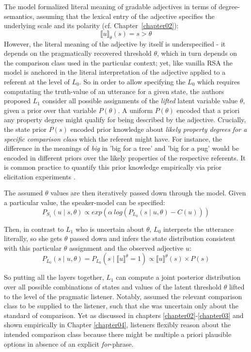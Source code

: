 The model formalized literal meaning of gradable adjectives in terms of degree-semantics, assuming that the lexical entry of the adjective specifies the underlying scale and its polarity (cf. Chapter~\ref{chapter02}):
\begin{equation}
\llbracket u \rrbracket_{\theta} (s) = s > \theta
\end{equation}
However, the literal meaning of the adjective by itself is underspecified - it depends on the pragmatically recovered threshold $\theta$, which in turn depends on the comparison class used in the particular context; yet, like vanilla RSA the model is anchored in the literal interpretation of the adjective applied to a referent at the level of $L_0$.  
So in order to allow specifying the $L_0$ which requires computating the truth-value of an utterance for a given state, the authors proposed $L_1$ consider all possible assignments of the \emph{lifted} latent variable value $\theta$, given a prior over that variable $P(\theta)$. A uniform $P(\theta)$ encoded that a priori any property degree might qualify for being described by the adjective. Crucially, the state prior $P(s)$ encoded prior knowledge about \emph{likely property degrees for a specific comparison class} which the referent might have. For instance, the difference in the meanings of \emph{big} in 'big for a tree' and 'big for a pug' would be encoded in different priors over the likely properties of the respective referents. It is common practice to quantify this prior knowledge empirically via prior elicitation experiments \parencite{problang}.

The assumed $\theta$ values are then iteratively passed down through the model. Given a particular value, the speaker-model can be specified:
\begin{equation}
	P_{S_1} (u \mid s, \theta) \propto exp(\alpha \: log (P_{L_0} (s \mid u, \theta) - C(u)) )
\end{equation}	

Then, in contrast to $L_1$ who is uncertain about $\theta$, $L_0$ interprets the utterance literally, so she gets $\theta$ passed down and infers the state distribution consistent with this particular $\theta$ assignment and the observed adjective $u$:
\begin{equation}
P_{L_0} (s \mid u, \theta) = P_{L_0} (s \mid \llbracket u \rrbracket ^\theta = 1 ) \propto \llbracket u \rrbracket ^\theta (s) \times P(s)
\end{equation}

So putting all the layers together, $L_1$ can compute a joint posterior distribution over all possible combinations of states and values of the latent threshold $\theta$ lifted to the level of the pragmatic listener. Notably, \textcite{lassiter2013context} assumed the relevant comparison class to be supplied to the listener, such that she was uncertain only about the standard of comparison. Yet as discussed in chapters \ref{chapter02}-\ref{chapter03} and shown empirically in Chapter \ref{chapter04}, listeners flexibly reason about the intended comparison class because there might be multiple a priori plausible options in absence of an explicit \emph{for}-phrase.

